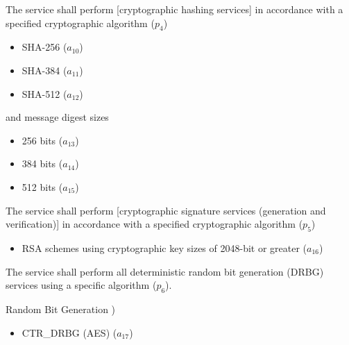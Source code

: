 \begin{description}
\begin{itemize}
    \end{itemize}
    \item[Cryptographic Operation - Hashing] The service shall perform [cryptographic hashing services] in accordance with a specified cryptographic algorithm (\(p_4\))
    \begin{itemize}
        \item SHA-256 (\(a_{10}\))
        \item SHA-384 (\(a_{11}\))
        \item SHA-512 (\(a_{12}\))
    \end{itemize}
    and message digest sizes
    \begin{itemize}
        \item 256 bits (\(a_{13}\))
        \item 384 bits (\(a_{14}\))
        \item 512 bits (\(a_{15}\))
    \end{itemize}
    \item[Cryptographic Operation - Signing] The service shall perform [cryptographic signature services (generation and verification)] in accordance with a specified cryptographic algorithm (\(p_5\))
    \begin{itemize}
        \item RSA schemes using cryptographic key sizes of 2048-bit or greater (\(a_{16}\))
    \end{itemize}
    
    \item[Random Bit Generation] The service shall perform all deterministic random bit generation (DRBG) services using a specific algorithm (\(p_6\)).
    \item Random Bit Generation )
    \begin{itemize}
       \item CTR\_DRBG (AES) (\(a_{17}\))
   \end{itemize}
    

\end{description}
